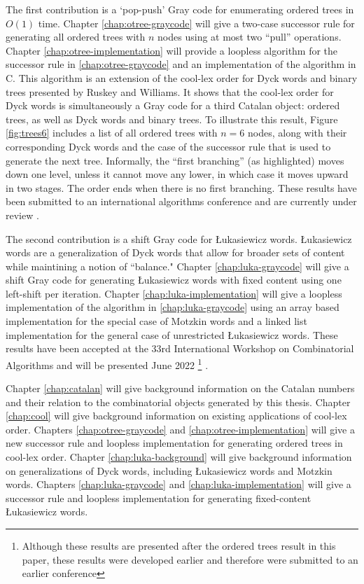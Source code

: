 The first contribution is a `pop-push' Gray code for enumerating ordered trees in $O(1)$ time. Chapter \ref{chap:otree-graycode} will give a two-case successor rule for generating all ordered trees with $n$ nodes using at most two ``pull'' operations. Chapter \ref{chap:otree-implementation} will provide a loopless algorithm for the successor rule in \ref{chap:otree-graycode} and an implementation of the algorithm in C.  This algorithm is an extension of the cool-lex order for Dyck words and binary trees presented by Ruskey and Williams. It shows that the cool-lex order for Dyck words is simultaneously a Gray code for a third Catalan object: ordered trees, as well as Dyck words and binary trees.  To illustrate this result, Figure \ref{fig:trees6} includes a list of all ordered trees with $n=6$ nodes, along with their corresponding Dyck words and the case of the successor rule that is used to generate the next tree.  Informally, the ``first branching'' (as highlighted) moves down one level, unless it cannot move any lower, in which case it moves upward in two stages.  The order ends when there is no first branching.  These results have been submitted to an international algorithms conference and are currently under review \cite{lapeypush}.

The second contribution is a shift Gray code for Łukasiewicz words.  Łukasiewicz words are a generalization of Dyck words that allow for broader sets of content while maintining a notion of ``balance." Chapter \ref{chap:luka-graycode} will give a shift Gray code for generating Łukasiewicz words with fixed content using one left-shift per iteration.  Chapter \ref{chap:luka-implementation} will give a loopless implementation of the algorithm in \ref{chap:luka-graycode} using an array based implementation for the special case of Motzkin words and a linked list implementation for the general case of unrestricted Łukasiewicz words.  These results have been accepted at the 33rd International Workshop on Combinatorial Algorithms and will be presented June 2022 \footnote{Although these results are presented after the ordered trees result in this paper, these results were developed earlier and therefore were submitted to an earlier conference} \cite{lapey2022shift}.

Chapter \ref{chap:catalan} will give background information on the Catalan numbers and their relation to the combinatorial objects generated by this thesis.  Chapter \ref{chap:cool} will give background information on existing applications of cool-lex order.  Chapters \ref{chap:otree-graycode} and \ref{chap:otree-implementation} will give a new successor rule and loopless implementation for generating ordered trees in cool-lex order.  Chapter \ref{chap:luka-background} will give background information on generalizations of Dyck words, including Łukasiewicz words and Motzkin words. Chapters \ref{chap:luka-graycode} and \ref{chap:luka-implementation} will give a successor rule and loopless implementation for generating fixed-content Łukasiewicz words.


